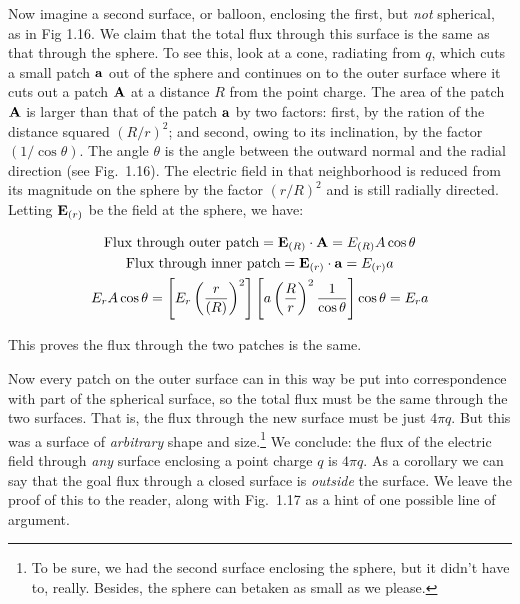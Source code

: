 
Now imagine a second surface, or balloon, enclosing the first, but
\emph{not} spherical, as in Fig 1.16. We claim that the total flux
through this surface is the same as that through the sphere.
To see this, look at a cone, radiating from $q$, which cuts a small
patch $\mathbf{a}$ out of the sphere and continues on to the outer surface
where it cuts out a patch $\mathbf{A}$ at a distance $R$ from the point
charge. The area of the patch $\mathbf{A}$ is larger than that of the patch
$\mathbf{a}$ by two factors: first, by the ration of the distance squared
$(R/r)^2$; and second, owing to its inclination, by the factor
$(1/\cos\theta)$. The angle $\theta$ is the angle between the outward
normal and the radial direction (see Fig.~1.16). The electric field
in that neighborhood is reduced from its magnitude on the sphere by
the factor $(r/R)^2$ and is still radially directed.
Letting $\mathbf{E}_{(r)}$ be the field at the sphere,
we have:

\begin{gather*}
\text{Flux through outer patch} =  \mathbf{E}_{(R)} \cdot \mathbf{A} =   E_ {(R)}  A\cos\theta \\
\text{Flux through inner patch} =  \mathbf{E}_ {(r)} \cdot \mathbf{a} =   E_ {(r)}  a \\
E_r A\cos\theta =  \left[E_r \left(\frac{r}{(R)} \right)^2  \right]
                   \left[a\left(\frac{R}{r} \right)^2  \frac{1}{\cos\theta}\right]
                   \cos\theta =  E_r a
\end{gather*}

\noindent This proves the flux through the two patches is the same.

Now every patch on the outer surface can in this way be put into
correspondence with part of the spherical surface, so the total flux
must be the same through the two surfaces. That is, the flux through
the new surface must be just $4 \pi q$. But this was a surface of
\emph{arbitrary} shape and size.\footnote{To be sure, we had the
second surface enclosing the sphere, but it didn't have to, really.
Besides, the sphere can betaken as small as we please.} We conclude:
the flux of the electric field through \emph{any} surface enclosing a
point charge $q$ is $4 \pi q$. As a corollary we can say that the
goal flux through a closed surface is \emph{outside} the surface. We
leave the proof of this to the reader, along with Fig.~1.17 as a
hint of one possible line of argument.

